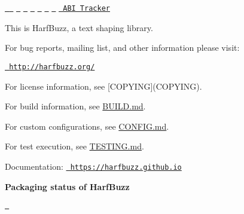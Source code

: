 \href{https://github.com/harfbuzz/harfbuzz/workflows/linux-ci/badge.svg}{\texttt{ }} \href{https://circleci.com/gh/harfbuzz/harfbuzz/tree/main}{\texttt{ }} \href{https://oss-fuzz-build-logs.storage.googleapis.com/index.html}{\texttt{ }} \href{https://scan.coverity.com/projects/behdad-harfbuzz}{\texttt{ }} \href{https://app.codacy.com/app/behdad/harfbuzz}{\texttt{ }} \href{https://codecov.io/gh/harfbuzz/harfbuzz}{\texttt{ }} \href{https://coveralls.io/r/harfbuzz/harfbuzz}{\texttt{ }} \href{https://repology.org/project/harfbuzz/versions}{\texttt{ }} \href{http://abi-laboratory.pro/tracker/timeline/harfbuzz/}{\texttt{ ABI Tracker}}

This is Harf\+Buzz, a text shaping library.

For bug reports, mailing list, and other information please visit\+:

\href{http://harfbuzz.org/}{\texttt{ http\+://harfbuzz.\+org/}}

For license information, see \mbox{[}COPYING\mbox{]}(COPYING).

For build information, see \mbox{\hyperlink{md__ase_sprite_aseprite_third_party_harfbuzz__b_u_i_l_d}{BUILD.md}}.

For custom configurations, see \mbox{\hyperlink{md__ase_sprite_aseprite_third_party_harfbuzz__c_o_n_f_i_g}{CONFIG.md}}.

For test execution, see \mbox{\hyperlink{md__ase_sprite_aseprite_third_party_harfbuzz__t_e_s_t_i_n_g}{TESTING.md}}.

Documentation\+: \href{https://harfbuzz.github.io}{\texttt{ https\+://harfbuzz.\+github.\+io}}



{\bfseries{Packaging status of Harf\+Buzz}}\begin{adjustwidth}{1em}{0em}


\href{https://repology.org/project/harfbuzz/versions}{\texttt{ }}

\end{adjustwidth}
